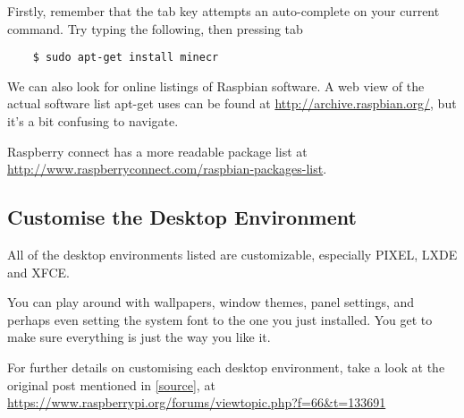 			Firstly, remember that the tab key attempts an auto-complete on your current command. Try typing the following, then pressing tab
	
	\begin{lstlisting}
	$ sudo apt-get install minecr
	\end{lstlisting}
	
			We can also look for online listings of Raspbian software. A web view of the actual software list apt-get uses can be found at \url{http://archive.raspbian.org/}, but it's a bit confusing to navigate.
			
			Raspberry connect has a more readable package list at \url{http://www.raspberryconnect.com/raspbian-packages-list}.
	
	\subsection*{Customise the Desktop Environment}

		All of the desktop environments listed are customizable, especially PIXEL, LXDE and XFCE.
		
		You can play around with wallpapers, window themes, panel settings, and perhaps even setting the system font to the one you just installed. You get to make sure everything is just the way you like it.
		
		For further details on customising each desktop environment, take a look at the original post mentioned in \autoref{source}, at \url{https://www.raspberrypi.org/forums/viewtopic.php?f=66&t=133691}
